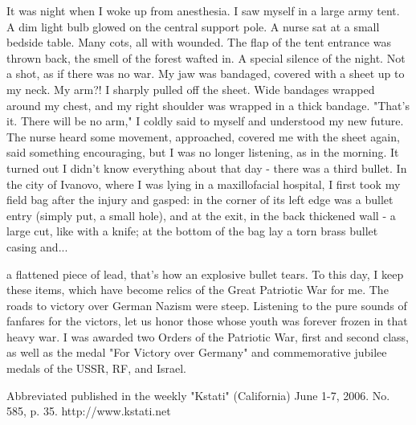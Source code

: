 \label{13-1}
It was night when I woke up from anesthesia. I saw myself in a large army tent. A dim light bulb glowed on the central support pole. A nurse sat at a small bedside table. Many cots, all with wounded. The flap of the tent entrance was thrown back, the smell of the forest wafted in. A special silence of the night. Not a shot, as if there was no war. My jaw was bandaged, covered with a sheet up to my neck. My arm?! I sharply pulled off the sheet. Wide bandages wrapped around my chest, and my right shoulder was wrapped in a thick bandage. "That's it. There will be no arm," I coldly said to myself and understood my new future. The nurse heard some movement, approached, covered me with the sheet again, said something encouraging, but I was no longer listening, as in the morning. It turned out I didn't know everything about that day - there was a third bullet. In the city of Ivanovo, where I was lying in a maxillofacial hospital, I first took my field bag after the injury and gasped: in the corner of its left edge was a bullet entry (simply put, a small hole), and at the exit, in the back thickened wall - a large cut, like with a knife; at the bottom of the bag lay a torn brass bullet casing and...

\label{14-1}
a flattened piece of lead, that's how an explosive bullet tears. To this day, I keep these items, which have become relics of the Great Patriotic War for me. The roads to victory over German Nazism were steep. Listening to the pure sounds of fanfares for the victors, let us honor those whose youth was forever frozen in that heavy war. I was awarded two Orders of the Patriotic War, first and second class, as well as the medal "For Victory over Germany" and commemorative jubilee medals of the USSR, RF, and Israel.

\label{14-2}
Abbreviated published in the weekly "Kstati" (California) June 1-7, 2006. No. 585, p. 35. http://www.kstati.net
